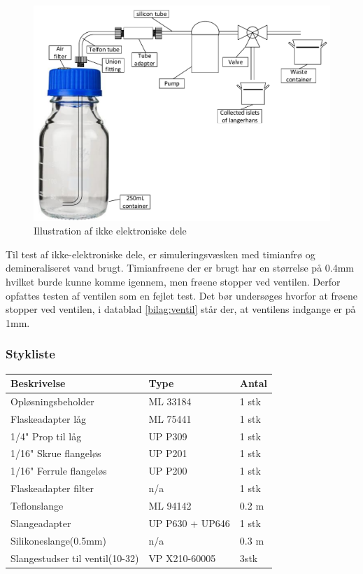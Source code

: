 \begin{figure}[H]
	\centering
	\includegraphics[width=1\textwidth]{billeder/Hardware/ikkeelektronisk.pdf}
	\caption{Illustration af ikke elektroniske dele}
	\label{fig:nonelectronic}
\end{figure}

Til test af ikke-elektroniske dele, er simuleringsvæsken med timianfrø og demineraliseret vand brugt. Timianfrøene der er brugt har en størrelse på 0.4mm hvilket burde kunne komme igennem, men frøene stopper ved ventilen. Derfor opfattes testen af ventilen som en fejlet test. Det bør undersøges hvorfor at frøene stopper ved ventilen, i datablad \ref{bilag:ventil} står der, at ventilens indgange er på 1mm. 

\newpage
\subsubsection{Stykliste} 
\begin{center}
		\begin{longtable}{ | m{6cm} | m{4cm}| m{2cm}| } 
			\hline
			\textbf{Beskrivelse} &\textbf{Type} & \textbf{Antal} \\ 
			\hline
			Opløsningsbeholder & ML 33184 & 1 stk \\ 
			\hline
			Flaskeadapter låg & ML 75441 & 1 stk \\ 
			\hline
			1/4" Prop til låg & UP P309 & 1 stk \\ 
			\hline
			1/16" Skrue flangeløs & UP P201 & 1 stk \\ 
			\hline
			1/16" Ferrule flangeløs & UP P200 & 1 stk \\ 
			\hline
			Flaskeadapter filter & n/a & 1 stk \\ 
			\hline	
			Teflonslange & ML 94142 & 0.2 m \\ 
			\hline
			Slangeadapter & UP P630 + UP646 & 1 stk \\ 
			\hline
			Silikoneslange(0.5mm) & n/a & 0.3 m \\ 
			\hline
			Slangestudser til ventil(10-32) & VP X210-60005 & 3stk \\ 
			\hline
		\end{longtable}
\end{center}

